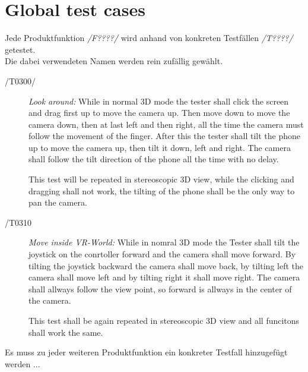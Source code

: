 \section{Global test cases}


Jede Produktfunktion \textit{/F????/} wird anhand von konkreten Testfällen \textit{/T????/} getestet.\\
Die dabei verwendeten Namen werden rein zufällig gewählt.

\begin{description}
  \item[/T0300/]
    \textit{Look around:} While in normal 3D mode the tester shall click the screen and drag first up to move the camera up.
    Then move down to move the camera down, then at last left and then right, all the time the camera must follow the movement of the finger.
    After this the tester shall tilt the phone up to move the camera up, then tilt it down, left and right. The camera shall follow the tilt direction of the phone all the time with no delay.

    This test will be repeated in stereoscopic 3D view, while the clicking and dragging shall not work, the tilting of the phone shall be the only way to pan the camera.
\end{description}

\begin{description}
  \item[/T0310]
    \textit{Move inside VR-World:} While in nomral 3D mode the Tester shall tilt the joystick on the conrtoller forward and the camera shall move forward.
    By tilting the joystick backward the camera shall move back, by tilting left the camera shall move left and by tilting right it shall move right.
    The camera shall allways follow the view point, so forward is allways in the center of the camera.

    This test shall be again repeated in stereoscopic 3D view and all funcitons shall work the same.
\end{description}
\textcolor{warning}{Es muss zu jeder weiteren Produktfunktion ein konkreter Testfall hinzugefügt werden ...}
